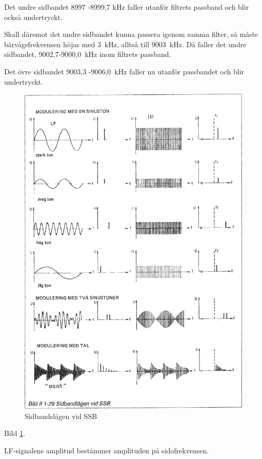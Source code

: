 Det undre sidbandet 8997 -8999,7 kHz faller utanför filtrets passband och blir
också undertryckt.

Skall däremot det undre sidbandet kunna passera igenom samma filter, så måste
bärvågsfrekvensen höjas med 3~kHz, alltså till 9003~kHz. Då faller det undre
sidbandet, 9002,7-9000,0~kHz inom filtrets passband.

Det övre sidbandet 9003,3 -9006,0~kHz faller nu utanför passbandet och blir
undertryckt.

\begin{figure}
\includegraphics[width=\textwidth]{images/bild_2_1-29}
\caption{Sidbandslägen vid SSB}
\label{fig:BildII1-29}
\end{figure}

Bild \ref{fig:BildII1-29}.

LF-signalens amplitud bestämmer amplituden på sidofrekvensen.

